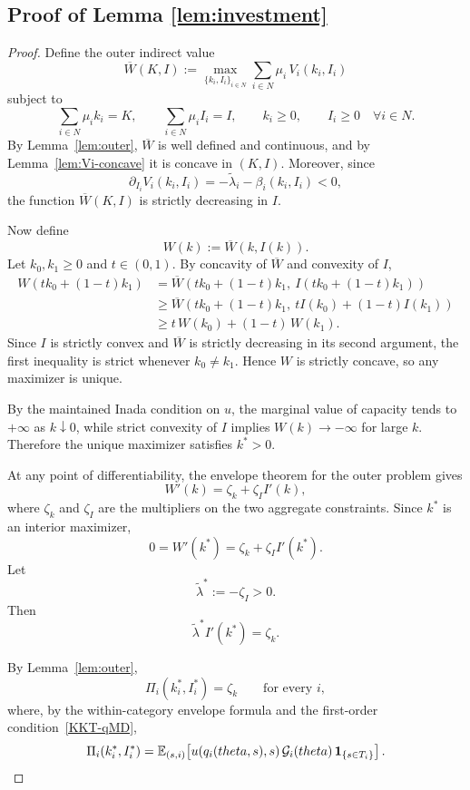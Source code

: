 \documentclass[master.tex]{subfiles}
\begin{document}
\subsection{Proof of Lemma \ref{lem:investment}}
\begin{proof}
Define the outer indirect value
\[
\overline W(K,I)
:=
\max_{\{k_i,I_i\}_{i\in N}}
\sum_{i\in N}\mu_i\,V_i(k_i,I_i)
\]
subject to
\[
\sum_{i\in N}\mu_i k_i = K,
\qquad
\sum_{i\in N}\mu_i I_i = I,
\qquad
k_i\geq 0,
\qquad
I_i\geq 0
\quad \forall i\in N.
\]
By Lemma~\ref{lem:outer}, $\overline W$ is well defined and continuous, and by Lemma~\ref{lem:Vi-concave} it is concave in $(K,I)$. Moreover, since
\[
\partial_{I_i}V_i(k_i,I_i)=-\tilde\lambda_i-\beta_i(k_i,I_i)<0,
\]
the function $\overline W(K,I)$ is strictly decreasing in $I$.

Now define
\[
W(k):=\overline W\!\left(k,I(k)\right).
\]
Let $k_0,k_1\geq 0$ and $t\in(0,1)$. By concavity of $\overline W$ and convexity of $I$,
\[
\begin{aligned}
W\!\left(tk_0+(1-t)k_1\right)
&=
\overline W\!\left(tk_0+(1-t)k_1,\ I\!\left(tk_0+(1-t)k_1\right)\right) \\
&\geq
\overline W\!\left(tk_0+(1-t)k_1,\ tI(k_0)+(1-t)I(k_1)\right) \\
&\geq
t\,W(k_0)+(1-t)\,W(k_1).
\end{aligned}
\]
Since $I$ is strictly convex and $\overline W$ is strictly decreasing in its second argument, the first inequality is strict whenever $k_0\neq k_1$. Hence $W$ is strictly concave, so any maximizer is unique.

By the maintained Inada condition on $u$, the marginal value of capacity tends to $+\infty$ as $k\downarrow 0$, while strict convexity of $I$ implies $W(k)\to -\infty$ for large $k$. Therefore the unique maximizer satisfies $k^\ast>0$.

At any point of differentiability, the envelope theorem for the outer problem gives
\[
W'(k)=\zeta_k+\zeta_I I'(k),
\]
where $\zeta_k$ and $\zeta_I$ are the multipliers on the two aggregate constraints. Since $k^\ast$ is an interior maximizer,
\[
0=W'(k^\ast)=\zeta_k+\zeta_I I'(k^\ast).
\]
Let
\[
\tilde\lambda^\ast:=-\zeta_I>0.
\]
Then
\[
\tilde\lambda^\ast I'(k^\ast)=\zeta_k.
\]

By Lemma~\ref{lem:outer},
\[
\Pi_i(k_i^\ast,I_i^\ast)=\zeta_k
\qquad\text{for every }i,
\]
where, by the within-category envelope formula and the first-order condition~\eqref{KKT-qMD},
\[
\Pi_i(k_i^\ast,I_i^\ast)
=
\mathbb{E}_{(s,i)}\!\left[
u(q_i(theta,s),s)\,\mathcal{G}_i(theta)\,\mathbf 1_{\{s\in T_i\}}
\right].
\]


\end{proof}
\end{document}
